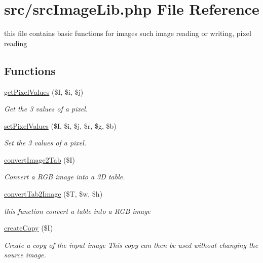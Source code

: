 \hypertarget{src_image_lib_8php}{
\section{src/src\-Image\-Lib.php \-File \-Reference}
\label{src_image_lib_8php}
}


this file contains basic functions for images such image reading or writing, pixel reading  


\subsection*{\-Functions}
\begin{DoxyCompactItemize}
\item 
\hyperlink{src_image_lib_8php_ab73076b368326e499ce3107206882e4d}{get\-Pixel\-Values} (\$\-I, \$i, \$j)
\begin{DoxyCompactList}\small\item\em \-Get the 3 values of a pixel. \end{DoxyCompactList}\item 
\hyperlink{src_image_lib_8php_a0570e456a725214ce051800c3eb2cc83}{set\-Pixel\-Values} (\$\-I, \$i, \$j, \$r, \$g, \$b)
\begin{DoxyCompactList}\small\item\em \-Set the 3 values of a pixel. \end{DoxyCompactList}\item 
\hyperlink{src_image_lib_8php_a071952c3f25b07f2880b97a13499ff3f}{convert\-Image2\-Tab} (\$\-I)
\begin{DoxyCompactList}\small\item\em \-Convert a \-R\-G\-B image into a 3\-D table. \end{DoxyCompactList}\item 
\hyperlink{src_image_lib_8php_af533441d503cdfabad1401c6bc76b7b0}{convert\-Tab2\-Image} (\$\-T, \$w, \$h)
\begin{DoxyCompactList}\small\item\em this function convert a table into a \-R\-G\-B image \end{DoxyCompactList}\item 
\hyperlink{src_image_lib_8php_a904b319b055d0880a306e466e164ec48}{create\-Copy} (\$\-I)
\begin{DoxyCompactList}\small\item\em \-Create a copy of the input image \-This copy can then be used without changing the source image. \end{DoxyCompactList}\item 

\end{DoxyCompactItemize}
